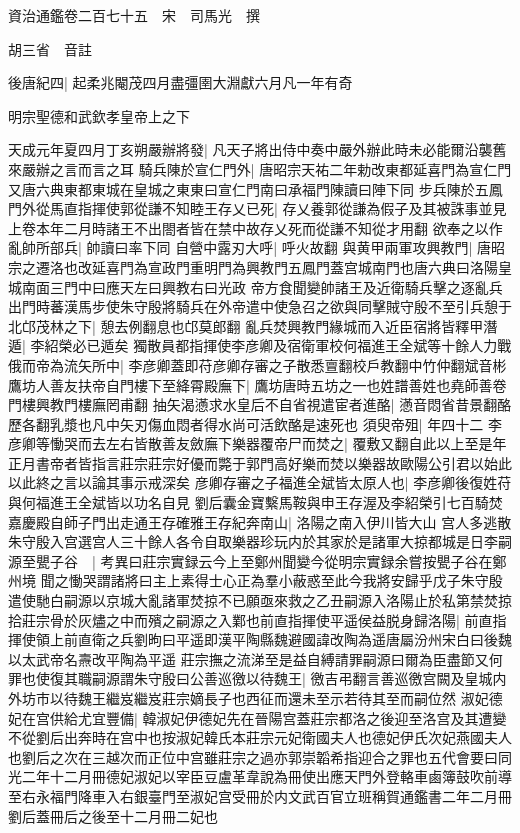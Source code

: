 資治通鑑卷二百七十五　宋　司馬光　撰

胡三省　音註

後唐紀四|{
	起柔兆閹茂四月盡彊圉大淵獻六月凡一年有奇}


明宗聖德和武欽孝皇帝上之下

天成元年夏四月丁亥朔嚴辦將發|{
	凡天子將出侍中奏中嚴外辦此時未必能爾沿襲舊來嚴辦之言而言之耳}
騎兵陳於宣仁門外|{
	唐昭宗天祐二年勅改東都延喜門為宣仁門又唐六典東都東城在皇城之東東曰宣仁門南曰承福門陳讀曰陣下同}
步兵陳於五鳳門外從馬直指揮使郭從謙不知睦王存乂已死|{
	存乂養郭從謙為假子及其被誅事並見上卷本年二月時諸王不出閤者皆在禁中故存乂死而從謙不知從才用翻}
欲奉之以作亂帥所部兵|{
	帥讀曰率下同}
自營中露刃大呼|{
	呼火故翻}
與黄甲兩軍攻興教門|{
	唐昭宗之遷洛也改延喜門為宣政門重明門為興教門五鳳門蓋宫城南門也唐六典曰洛陽皇城南面三門中曰應天左曰興教右曰光政}
帝方食聞變帥諸王及近衛騎兵擊之逐亂兵出門時蕃漢馬步使朱守殷將騎兵在外帝遣中使急召之欲與同擊賊守殷不至引兵憩于北邙茂林之下|{
	憩去例翻息也邙莫郎翻}
亂兵焚興教門緣城而入近臣宿將皆釋甲潛遁|{
	李紹榮必已遁矣}
獨散員都指揮使李彦卿及宿衛軍校何福進王全斌等十餘人力戰俄而帝為流矢所中|{
	李彦卿蓋即苻彦卿存審之子散悉亶翻校戶教翻中竹仲翻斌音彬}
鷹坊人善友扶帝自門樓下至絳霄殿廡下|{
	鷹坊唐時五坊之一也姓譜善姓也堯師善卷門樓興教門樓廡罔甫翻}
抽矢渴懣求水皇后不自省視遣宦者進酪|{
	懣音悶省昔景翻酪歷各翻乳漿也凡中矢刃傷血悶者得水尚可活飲酪是速死也}
須臾帝殂|{
	年四十二}
李彦卿等慟哭而去左右皆散善友斂廡下樂器覆帝尸而焚之|{
	覆敷又翻自此以上至是年正月書帝者皆指言莊宗莊宗好優而斃于郭門高好樂而焚以樂器故歐陽公引君以始此以此終之言以論其事示戒深矣}
彦卿存審之子福進全斌皆太原人也|{
	李彦卿後復姓苻與何福進王全斌皆以功名自見}
劉后囊金寶繫馬鞍與申王存渥及李紹榮引七百騎焚嘉慶殿自師子門出走通王存確雅王存紀奔南山|{
	洛陽之南入伊川皆大山}
宫人多逃散朱守殷入宫選宫人三十餘人各令自取樂器珍玩内於其家於是諸軍大掠都城是日李嗣源至甖子谷　|{
	考異曰莊宗實録云今上至鄭州聞變今從明宗實録余嘗按甖子谷在鄭州境}
聞之慟哭謂諸將曰主上素得士心正為羣小蔽惑至此今我將安歸乎戊子朱守殷遣使馳白嗣源以京城大亂諸軍焚掠不已願亟來救之乙丑嗣源入洛陽止於私第禁焚掠拾莊宗骨於灰燼之中而殯之嗣源之入鄴也前直指揮使平遥侯益脱身歸洛陽|{
	前直指揮使領上前直衛之兵劉昫曰平遥即漢平陶縣魏避國諱改陶為遥唐屬汾州宋白曰後魏以太武帝名燾改平陶為平遥}
莊宗撫之流涕至是益自縛請罪嗣源曰爾為臣盡節又何罪也使復其職嗣源謂朱守殷曰公善巡徼以待魏王|{
	徼吉弔翻言善巡徼宫闕及皇城内外坊市以待魏王繼岌繼岌莊宗嫡長子也西征而還未至示若待其至而嗣位然}
淑妃德妃在宫供給尤宜豐備|{
	韓淑妃伊德妃先在晉陽宫蓋莊宗都洛之後迎至洛宫及其遭變不從劉后出奔時在宫中也按淑妃韓氏本莊宗元妃衛國夫人也德妃伊氏次妃燕國夫人也劉后之次在三越次而正位中宫雖莊宗之過亦郭崇韜希指迎合之罪也五代會要曰同光二年十二月冊德妃淑妃以宰臣豆盧革韋說為冊使出應天門外登輅車鹵簿鼓吹前導至右永福門降車入右銀臺門至淑妃宫受冊於内文武百官立班稱賀通鑑書二年二月冊劉后蓋冊后之後至十二月冊二妃也}
